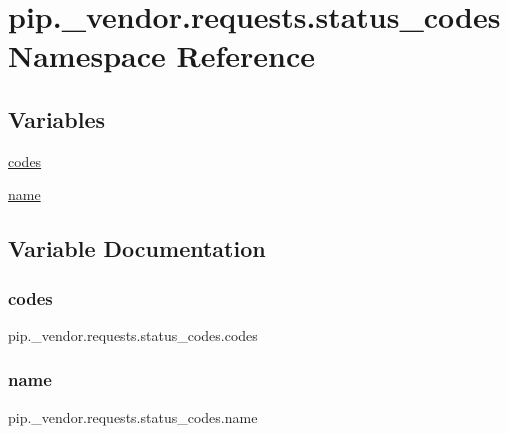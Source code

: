 \hypertarget{namespacepip_1_1__vendor_1_1requests_1_1status__codes}{}\section{pip.\+\_\+vendor.\+requests.\+status\+\_\+codes Namespace Reference}
\label{namespacepip_1_1__vendor_1_1requests_1_1status__codes}
\subsection*{Variables}
\begin{DoxyCompactItemize}
\item 
\hyperlink{namespacepip_1_1__vendor_1_1requests_1_1status__codes_a62dadaba9b4c5c61f2e230e767a648c5}{codes}
\item 
\hyperlink{namespacepip_1_1__vendor_1_1requests_1_1status__codes_a389c164a02cf68ff9be6050ef1d841e4}{name}
\end{DoxyCompactItemize}


\subsection{Variable Documentation}
\mbox{\label{namespacepip_1_1__vendor_1_1requests_1_1status__codes_a62dadaba9b4c5c61f2e230e767a648c5}} 
\subsubsection{\texorpdfstring{codes}{codes}}
{\footnotesize\ttfamily pip.\+\_\+vendor.\+requests.\+status\+\_\+codes.\+codes}

\mbox{\label{namespacepip_1_1__vendor_1_1requests_1_1status__codes_a389c164a02cf68ff9be6050ef1d841e4}} 
\subsubsection{\texorpdfstring{name}{name}}
{\footnotesize\ttfamily pip.\+\_\+vendor.\+requests.\+status\+\_\+codes.\+name}


